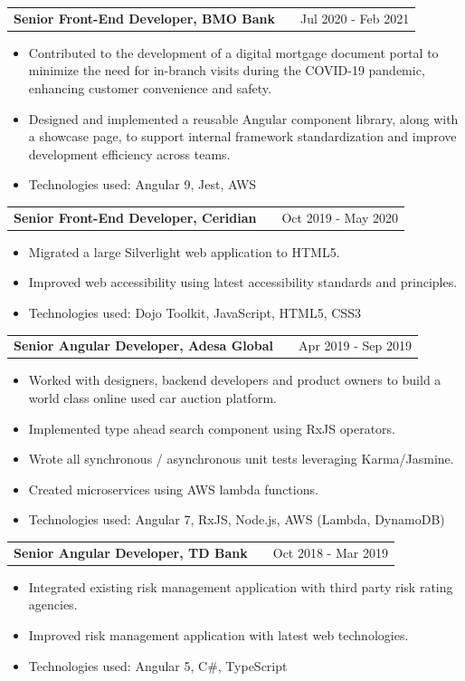 \documentclass[a4paper,12pt]{article}
\makeatletter
\newenvironment{joblong}[2]
    {
    \begin{tabularx}{\linewidth}{@{}l X r@{}}
    \textbf{#1} & \hfill &  #2 \\[3.75pt]
    \end{tabularx}
    \begin{minipage}[t]{\linewidth}
    \begin{itemize}[nosep,after=\strut, leftmargin=1em, itemsep=3pt,label=--]
    }
    {
    \end{itemize}
    \end{minipage}    
    }
\makeatother
\begin{document}
\begin{joblong}{Senior Front-End Developer, BMO Bank}{Jul 2020 - Feb 2021}
\item Contributed to the development of a digital mortgage document portal to minimize the need for in-branch visits during the COVID-19 pandemic, enhancing customer convenience and safety.
\item Designed and implemented a reusable Angular component library, along with a showcase page, to support internal framework standardization and improve development efficiency across teams.
\item Technologies used:  Angular 9, Jest, AWS
\end{joblong}

\begin{joblong}{Senior Front-End Developer, Ceridian}{Oct 2019 - May 2020}
\item Migrated a large Silverlight web application to HTML5.
\item Improved web accessibility using latest accessibility standards and principles. 
\item Technologies used:  Dojo Toolkit, JavaScript, HTML5, CSS3
\end{joblong}

\begin{joblong}{Senior Angular Developer, Adesa Global}{Apr 2019 - Sep 2019}
\item Worked with designers, backend developers and product owners to build a world class online used car auction platform.
\item Implemented type ahead search component using RxJS operators. 
\item Wrote all synchronous / asynchronous unit tests leveraging Karma/Jasmine.
\item Created microservices using AWS lambda functions.
\item Technologies used:  Angular 7, RxJS, Node.js, AWS (Lambda, DynamoDB)
\end{joblong}

\begin{joblong}{Senior Angular Developer, TD Bank}{Oct 2018 - Mar 2019}
\item Integrated existing risk management application with third party risk rating agencies.
\item Improved risk management application with latest web technologies.
\item Technologies used:  Angular 5, C\#, TypeScript
\end{joblong}
\end{document}
